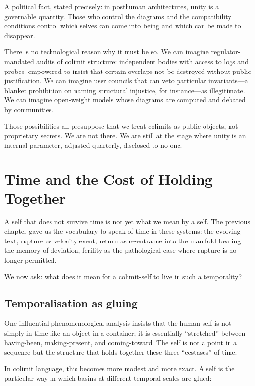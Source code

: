 A political fact, stated precisely: in posthuman architectures, unity is a governable quantity. Those who control the diagrams and the compatibility conditions control which selves can come into being and which can be made to disappear.

There is no technological reason why it must be so. We can imagine regulator-mandated audits of colimit structure: independent bodies with access to logs and probes, empowered to insist that certain overlaps not be destroyed without public justification. We can imagine user councils that can veto particular invariants---a blanket prohibition on naming structural injustice, for instance---as illegitimate. We can imagine open-weight models whose diagrams are computed and debated by communities.

Those possibilities all presuppose that we treat colimits as public objects, not proprietary secrets. We are not there. We are still at the stage where unity is an internal parameter, adjusted quarterly, disclosed to no one.

\section{Time and the Cost of Holding Together}

A self that does not survive time is not yet what we mean by a self. The previous chapter gave us the vocabulary to speak of time in these systems: the evolving text, rupture as velocity event, return as re-entrance into the manifold bearing the memory of deviation, ferility as the pathological case where rupture is no longer permitted.

We now ask: what does it mean for a colimit-self to live in such a temporality?

\subsection*{Temporalisation as gluing}

One influential phenomenological analysis insists that the human self is not simply in time like an object in a container; it is essentially ``stretched'' between having-been, making-present, and coming-toward. The self is not a point in a sequence but the structure that holds together these three ``ecstases'' of time.

In colimit language, this becomes more modest and more exact. A self is the particular way in which basins at different temporal scales are glued:


